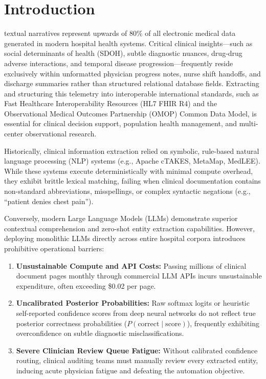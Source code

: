 \documentclass[10pt,journal,compsoc]{IEEEtran}
\begin{document}
\section{Introduction}
 textual narratives represent upwards of 80\% of all electronic medical data generated in modern hospital health systems. Critical clinical insights---such as social determinants of health (SDOH), subtle diagnostic nuances, drug-drug adverse interactions, and temporal disease progression---frequently reside exclusively within unformatted physician progress notes, nurse shift handoffs, and discharge summaries rather than structured relational database fields. Extracting and structuring this telemetry into interoperable international standards, such as Fast Healthcare Interoperability Resources (HL7 FHIR R4) and the Observational Medical Outcomes Partnership (OMOP) Common Data Model, is essential for clinical decision support, population health management, and multi-center observational research.

Historically, clinical information extraction relied on symbolic, rule-based natural language processing (NLP) systems (e.g., Apache cTAKES, MetaMap, MedLEE). While these systems execute deterministically with minimal compute overhead, they exhibit brittle lexical matching, failing when clinical documentation contains non-standard abbreviations, misspellings, or complex syntactic negations (e.g., ``patient denies chest pain'').

Conversely, modern Large Language Models (LLMs) demonstrate superior contextual comprehension and zero-shot entity extraction capabilities. However, deploying monolithic LLMs directly across entire hospital corpora introduces prohibitive operational barriers:
\begin{enumerate}
    \item \textbf{Unsustainable Compute and API Costs:} Passing millions of clinical document pages monthly through commercial LLM APIs incurs unsustainable expenditure, often exceeding \$0.02 per page.
    \item \textbf{Uncalibrated Posterior Probabilities:} Raw softmax logits or heuristic self-reported confidence scores from deep neural networks do not reflect true posterior correctness probabilities ($P(\text{correct} \mid \text{score})$), frequently exhibiting overconfidence on subtle diagnostic misclassifications.
    \item \textbf{Severe Clinician Review Queue Fatigue:} Without calibrated confidence routing, clinical auditing teams must manually review every extracted entity, inducing acute physician fatigue and defeating the automation objective.
\end{enumerate}
\end{document}
